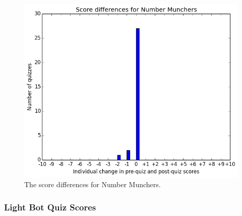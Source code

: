 			\begin{figure}[h] 
			\centering 
			\includegraphics[width=\textwidth]{munchers_results.png} 
			\caption{The score differences for Number Munchers.}
			\end{figure}


\cleardoublepage

		\subsubsection{Light Bot Quiz Scores}

			

